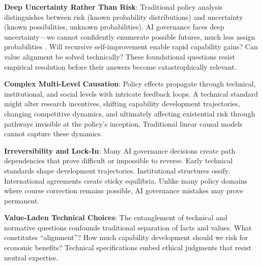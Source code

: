 \documentclass[
  11pt,
  letterpaper,
  openany]{book}
\begin{document}
\textbf{Deep Uncertainty Rather Than Risk}: Traditional policy analysis
distinguishes between risk (known probability distributions) and
uncertainty (known possibilities, unknown probabilities). AI governance
faces deep uncertainty---we cannot confidently enumerate possible
futures, much less assign probabilities \textcite{hallegatte2012}. Will
recursive self-improvement enable rapid capability gains? Can value
alignment be solved technically? These foundational questions resist
empirical resolution before their answers become catastrophically
relevant.

\textbf{Complex Multi-Level Causation}: Policy effects propagate through
technical, institutional, and social levels with intricate feedback
loops. A technical standard might alter research incentives, shifting
capability development trajectories, changing competitive dynamics, and
ultimately affecting existential risk through pathways invisible at the
policy's inception. Traditional linear causal models cannot capture
these dynamics.

\textbf{Irreversibility and Lock-In}: Many AI governance decisions
create path dependencies that prove difficult or impossible to reverse.
Early technical standards shape development trajectories. Institutional
structures ossify. International agreements create sticky equilibria.
Unlike many policy domains where course correction remains possible, AI
governance mistakes may prove permanent.

\textbf{Value-Laden Technical Choices}: The entanglement of technical
and normative questions confounds traditional separation of facts and
values. What constitutes ``alignment''? How much capability development
should we risk for economic benefits? Technical specifications embed
ethical judgments that resist neutral expertise.
\end{document}
